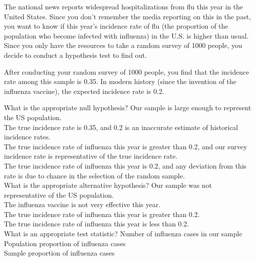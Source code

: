 
The national news reports widespread hospitalizations from flu this year in the United States. Since you don't remember the media reporting on this in the past, you want to know if this year's incidence rate of flu (the proportion of the population who become infected with influenza) in the U.S. is higher than usual. Since you only have the resources to take a random survey of 1000 people, you decide to conduct a hypothesis test to find out.

After conducting your random survey of 1000 people, you find that the incidence rate among this sample is 0.35. In modern history (since the invention of the influenza vaccine), the expected incidence rate is 0.2.
\begin{enumerate} 
     What is the appropriate null hypothesis?
    \vskip 0.05in
    {\bubble} Our sample is large enough to represent the US population.\\[2pt]
    {\bubble} The true incidence rate is 0.35, and 0.2 is an inaccurate estimate of historical incidence rates.\\[2pt]
    {\bubble} The true incidence rate of influenza this year is greater than 0.2, and our survey incidence rate is representative of the true incidence rate.\\[2pt]
    {\solutionbubble} The true incidence rate of influenza this year is 0.2, and any deviation from this rate is due to chance in the selection of the random sample.\\[2pt]

     What is the appropriate alternative hypothesis?
    \vskip 0.05in
    {\bubble} Our sample was not representative of the US population.\\[2pt]
    {\bubble} The influenza vaccine is not very effective this year.\\[2pt]
    {\solutionbubble} The true incidence rate of influenza this year is greater than 0.2.\\[2pt]
    {\bubble} The true incidence rate of influenza this year is less than 0.2.\\[2pt]

     What is an appropriate test statistic?
    \vskip 0.05in
    {\bubble} Number of influenza cases in our sample\\[2pt]
    {\bubble} Population proportion of influenza cases\\[2pt]
    {\solutionbubble} Sample proportion of influenza cases\\[2pt]


\end{enumerate}
